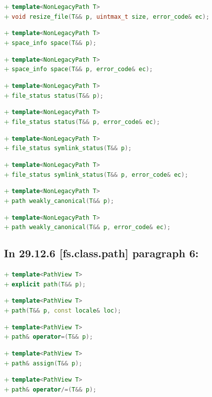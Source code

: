 \documentclass[11pt]{article}
\newcommand{\code}[2][cpp]{\lstinline[language=#1,basicstyle=\small\ttfamily]{#2}}
\newcommand{\tsrefp}[3]{\subsection*{In #2 \textbf{[#1]} paragraph #3:}}
\newcommand{\tsreplace}[3]{\textcolor{red}{\sout{#1}}#2\textcolor{darkgreen}{#3}}
\begin{document}
\tsreplace{}{}{+ \code{template<NonLegacyPath T>}}\\
\tsreplace{}{}{+ \code{void resize_file(T&& p, uintmax_t size, error_code& ec);}}

\tsreplace{}{}{+ \code{template<NonLegacyPath T>}}\\
\tsreplace{}{}{+ \code{space_info space(T&& p);}}

\tsreplace{}{}{+ \code{template<NonLegacyPath T>}}\\
\tsreplace{}{}{+ \code{space_info space(T&& p, error_code& ec);}}

\tsreplace{}{}{+ \code{template<NonLegacyPath T>}}\\
\tsreplace{}{}{+ \code{file_status status(T&& p);}}

\tsreplace{}{}{+ \code{template<NonLegacyPath T>}}\\
\tsreplace{}{}{+ \code{file_status status(T&& p, error_code& ec);}}

\tsreplace{}{}{+ \code{template<NonLegacyPath T>}}\\
\tsreplace{}{}{+ \code{file_status symlink_status(T&& p);}}

\tsreplace{}{}{+ \code{template<NonLegacyPath T>}}\\
\tsreplace{}{}{+ \code{file_status symlink_status(T&& p, error_code& ec);}}

\tsreplace{}{}{+ \code{template<NonLegacyPath T>}}\\
\tsreplace{}{}{+ \code{path weakly_canonical(T&& p);}}

\tsreplace{}{}{+ \code{template<NonLegacyPath T>}}\\
\tsreplace{}{}{+ \code{path weakly_canonical(T&& p, error_code& ec);}}


\tsrefp{fs.class.path}{29.12.6}{6}

\tsreplace{}{}{+ \code{template<PathView T>}}\\
\tsreplace{}{}{+ \code{explicit path(T&& p);}}

\tsreplace{}{}{+ \code{template<PathView T>}}\\
\tsreplace{}{}{+ \code{path(T&& p, const locale& loc);}}

\tsreplace{}{}{+ \code{template<PathView T>}}\\
\tsreplace{}{}{+ \code{path& operator=(T&& p);}}

\tsreplace{}{}{+ \code{template<PathView T>}}\\
\tsreplace{}{}{+ \code{path& assign(T&& p);}}

\tsreplace{}{}{+ \code{template<PathView T>}}\\
\tsreplace{}{}{+ \code{path& operator/=(T&& p);}}
\end{document}
